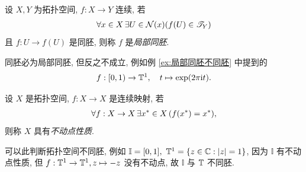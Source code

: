     \begin{Definition}[局部同胚]
        设 $ X, Y $ 为拓扑空间, $ f: X\to Y $ 连续, 若
        \begin{align*}
            \forall x\in X\,\exists U\in\mathcal{N}(x)(f(U)\in\mathscr{T}_{Y})
        \end{align*}
        且 $ f:U\to f(U) $ 是同胚, 则称 $ f $ 是\emph{局部同胚}.
    \end{Definition}
    同胚必为局部同胚, 但反之不成立, 例如例 \ref{ex:局部同胚不同胚} 中提到的
    \begin{align*}
        f: [0, 1)\to \mathbb{T}^{1},\quad t\mapsto \exp(2\pi \mathrm{i} t).
    \end{align*}

    \begin{Definition}[不动点性质]
        设 $ X $ 是拓扑空间, $ f: X\to X $ 是连续映射, 若
        \begin{align*}
            \forall f: X\to X\, \exists x^{*}\in X\,(f(x^{*})=x^{*}),
        \end{align*}
        则称 $ X $ 具有\emph{不动点性质}. 
    \end{Definition}
    可以此判断拓扑空间不同胚, 例如 $ \mathbb{I}=[0, 1],\ \mathbb{T}^{1}=\left\{ z\in\mathbb{C}: \left| z \right| =1 \right\} $, 因为 $ \mathbb{I} $ 有不动点性质, 但 $ f: \mathbb{T}^{1}\to \mathbb{T}^{1}, z\mapsto -z $ 没有不动点, 故 $ \mathbb{I} $ 与 $ \mathbb{T} $ 不同胚. 